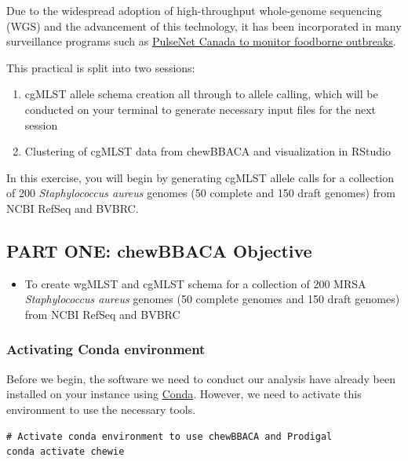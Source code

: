 \documentclass[
]{book}
\providecommand{\tightlist}{%
  \setlength{\itemsep}{0pt}\setlength{\parskip}{0pt}}
\begin{document}
Due to the widespread adoption of high-throughput whole-genome sequencing (WGS) and the advancement of this technology, it has been incorporated in many surveillance programs such as \href{https://www.canada.ca/en/public-health/programs/pulsenet-canada.html}{PulseNet Canada to monitor foodborne outbreaks}.

This practical is split into two sessions:

\begin{enumerate}
\def\labelenumi{\arabic{enumi}.}
\tightlist
\item
  cgMLST allele schema creation all through to allele calling, which will be conducted on your terminal to generate necessary input files for the next session
\item
  Clustering of cgMLST data from chewBBACA and visualization in RStudio
\end{enumerate}

In this exercise, you will begin by generating cgMLST allele calls for a collection of 200 \emph{Staphylococcus aureus} genomes (50 complete and 150 draft genomes) from NCBI RefSeq and BVBRC.

\subsection{PART ONE: chewBBACA Objective}\label{part-one-chewbbaca-objective}

\begin{itemize}
\tightlist
\item
  To create wgMLST and cgMLST schema for a collection of 200 MRSA \emph{Staphylococcus aureus} genomes (50 complete genomes and 150 draft genomes) from NCBI RefSeq and BVBRC
\end{itemize}

\subsubsection{Activating Conda environment}\label{activating-conda-environment}

Before we begin, the software we need to conduct our analysis have already been installed on your instance using \href{https://docs.conda.io/projects/conda/en/stable/user-guide/install/index.html}{Conda}. However, we need to activate this environment to use the necessary tools.

\begin{verbatim}
# Activate conda environment to use chewBBACA and Prodigal
conda activate chewie
\end{verbatim}
\end{document}
